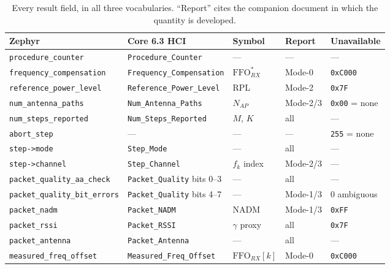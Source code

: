 \documentclass[11pt,a4paper]{article}
\newcommand{\code}[1]{\texttt{\small #1}}
\newcommand{\FFO}{\ensuremath{\mathrm{FFO}}}
\newcommand{\RPL}{\ensuremath{\mathrm{RPL}}}
\newcommand{\NADM}{\ensuremath{\mathrm{NADM}}}
\newcommand{\Nap}{\ensuremath{N_{AP}}}
\begin{document}
\begin{table}[htb]
\caption{Every result field, in all three vocabularies. ``Report'' cites the companion document in
which the quantity is developed.}
\label{tab:master}
\centering\scriptsize
\begin{tabular}{@{}L{31mm}L{31mm}L{24mm}L{18mm}L{28mm}@{}}
\toprule
Zephyr & Core 6.3 HCI & Symbol & Report & Unavailable \\
\midrule
\code{procedure\_\allowbreak{}counter} & \code{Procedure\_\allowbreak{}Counter} & --- & --- & --- \\
\code{frequency\_\allowbreak{}compensation} & \code{Frequency\_\allowbreak{}Compensation} & $\FFO^{*}_{RX}$ & Mode-0 & \code{0xC000} \\
\code{reference\_\allowbreak{}power\_\allowbreak{}level} & \code{Reference\_\allowbreak{}Power\_\allowbreak{}Level} & $\RPL$ & Mode-2 & \code{0x7F} \\
\code{num\_\allowbreak{}antenna\_\allowbreak{}paths} & \code{Num\_\allowbreak{}Antenna\_\allowbreak{}Paths} & $\Nap$ & Mode-2/3 & \code{0x00} = none \\
\code{num\_\allowbreak{}steps\_\allowbreak{}reported} & \code{Num\_\allowbreak{}Steps\_\allowbreak{}Reported} & $M$, $K$ & all & --- \\
\code{abort\_\allowbreak{}step} & --- & --- & --- & \code{255} = none \\
\code{step->mode} & \code{Step\_\allowbreak{}Mode} & --- & all & --- \\
\code{step->channel} & \code{Step\_\allowbreak{}Channel} & $f_k$ index & Mode-2/3 & --- \\
\code{packet\_\allowbreak{}quality\_\allowbreak{}aa\_\allowbreak{}check} & \code{Packet\_\allowbreak{}Quality} bits 0--3 & --- & all & --- \\
\code{packet\_\allowbreak{}quality\_\allowbreak{}bit\_\allowbreak{}errors} & \code{Packet\_\allowbreak{}Quality} bits 4--7 & --- & Mode-1/3 & 0 ambiguous \\
\code{packet\_\allowbreak{}nadm} & \code{Packet\_\allowbreak{}NADM} & $\NADM$ & Mode-1/3 & \code{0xFF} \\
\code{packet\_\allowbreak{}rssi} & \code{Packet\_\allowbreak{}RSSI} & $\gamma$ proxy & all & \code{0x7F} \\
\code{packet\_\allowbreak{}antenna} & \code{Packet\_\allowbreak{}Antenna} & --- & all & --- \\
\code{measured\_\allowbreak{}freq\_\allowbreak{}offset} & \code{Measured\_\allowbreak{}Freq\_\allowbreak{}Offset} & $\FFO_{RX}[k]$ & Mode-0 & \code{0xC000} \\

\end{tabular}
\end{table}
\end{document}
